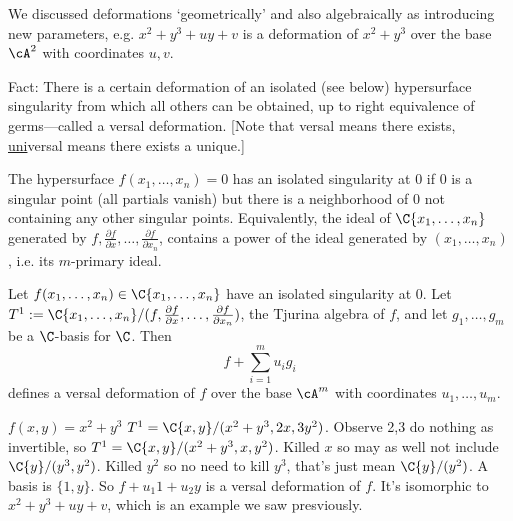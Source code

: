 




We discussed deformations `geometrically' and also algebraically as introducing new parameters, e.g. $x^2+y^3+uy+v$ is a deformation of $x^2+y^3$ over the base $\cA^2$ with coordinates $u,v$. 


Fact: There is a certain deformation of an isolated (see below) hypersurface singularity from which all others can be obtained, up to right equivalence of germs---called a versal deformation. [Note that versal means there exists, \underline{uni}versal means there exists a unique.] 


The hypersurface $f(x_1,\ldots,x_n)=0$ has an isolated singularity at 0 if 0 is a singular point (all partials vanish) but there is a neighborhood of 0 not containing any other singular points. Equivalently, the ideal of $\C\{x_1,\ldots,x_n\}$ generated by $f,\frac{\partial f}{\partial x},\ldots, \frac{\partial f}{\partial x_n}$, contains a power of the ideal generated by $(x_1,\ldots,x_n)$, i.e. its $m$-primary ideal. 


\begin{thm}
Let $f(x_1,\ldots,x_n) \in \C\{x_1,\ldots,x_n\}$ have an isolated singularity at 0. Let $T^1:= \C\{x_1,\ldots,x_n\}/(f,\frac{\partial f}{\partial x},\ldots, \frac{\partial f}{\partial x_n})$, the Tjurina algebra of $f$, and let $g_1,\ldots,g_m$ be a $\C$-basis for $\C$. Then 
	\[
	f + \sum_{i=1}^m u_i g_i
	\]
defines a versal deformation of $f$ over the base $\cA^m$ with coordinates $u_1,\ldots,u_m$. 
\end{thm}



\begin{ex}
$f(x,y)= x^2+y^3$
$T^1= \C\{x,y\}/(x^2+y^3,2x,3y^2)$. 
Observe 2,3 do nothing as invertible, so
$T^1= \C\{x,y\}/(x^2+y^3,x,y^2)$. 
Killed $x$ so may as well not include
$\C\{y\}/(y^3,y^2)$. 
Killed $y^2$ so no need to kill $y^3$, that's just mean
$\C\{y\}/(y^2)$. 
A basis is $\{1,y\}$. 
So $f+ u_1 1 + u_2 y$ is a versal deformation of $f$. It's isomorphic to $x^2+y^3+uy+v$, which is an example we saw presviously. 
\end{ex}


